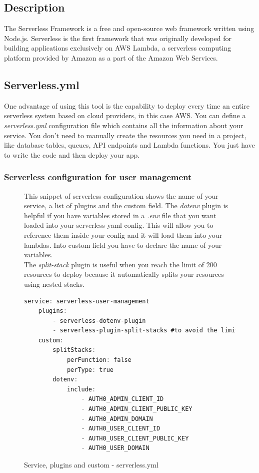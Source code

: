 \newpage
{}
\subsection{Description}
The Serverless Framework is a free and open-source web framework written using Node.js. Serverless is the first framework that was originally developed for building applications exclusively on AWS Lambda, a serverless computing platform provided by Amazon as a part of the Amazon Web Services.
\subsection{Serverless.yml}
One advantage of using this tool is the capability to deploy every time an entire serverless system based on cloud providers, in this case AWS. You can define a \emph{serverless.yml} configuration file which contains all the information about your service. You don't need to manually create the resources you need in a project, like database tables, queues, API endpoints and Lambda functions. You just have to write the code and then deploy your app.
\subsubsection{Serverless configuration for user management}
\begin{figure} [H]
This snippet of serverless configuration shows the name of your service, a list of plugins and the custom field. The \emph{dotenv} plugin is helpful if you have variables stored in a \emph{.env} file that you want loaded into your serverless yaml config. This will allow you to reference them inside your config and it will load them into your lambdas. Into custom field you have to declare the name of your variables.\\
The \emph{split-stack} plugin is useful when you reach the limit of 200 resources to deploy because it automatically splits your resources using nested stacks.

\begin{lstlisting}[language=C]
	service: serverless-user-management
	plugins:
		- serverless-dotenv-plugin
		- serverless-plugin-split-stacks #to avoid the limit of 200 resources
	custom:
		splitStacks:
			perFunction: false
			perType: true
		dotenv: 
			include:
				- AUTH0_ADMIN_CLIENT_ID
				- AUTH0_ADMIN_CLIENT_PUBLIC_KEY
				- AUTH0_ADMIN_DOMAIN
				- AUTH0_USER_CLIENT_ID
				- AUTH0_USER_CLIENT_PUBLIC_KEY
				- AUTH0_USER_DOMAIN
\end{lstlisting}
	\caption{Service, plugins and custom - serverless.yml}\label{}
\end{figure}

